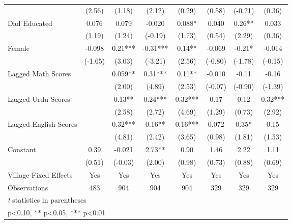 \begin{sidewaystable}[htbp]
\begin{tabular}{l*{7}{c}}
                &   (2.56)   &   (1.18)   &   (2.12)   &   (0.29)   &   (0.58)   &  (-0.21)   &   (0.36)   \\
Dad Educated    &    0.076   &    0.079   &   -0.020   &    0.088*  &    0.040   &     0.26** &    0.033   \\
                &   (1.19)   &   (1.24)   &  (-0.19)   &   (1.73)   &   (0.54)   &   (2.29)   &   (0.36)   \\
Female          &   -0.098   &     0.21***&    -0.31***&     0.14** &   -0.069   &    -0.21*  &   -0.014   \\
                &  (-1.65)   &   (3.03)   &  (-3.21)   &   (2.56)   &  (-0.80)   &  (-1.78)   &  (-0.15)   \\
Lagged Math Scores&            &    0.059** &     0.31***&     0.11** &   -0.010   &    -0.11   &    -0.16   \\
                &            &   (2.00)   &   (4.89)   &   (2.53)   &  (-0.07)   &  (-0.90)   &  (-1.39)   \\
Lagged Urdu Scores&            &     0.13** &     0.24***&     0.32***&     0.17   &     0.12   &     0.32***\\
                &            &   (2.58)   &   (2.72)   &   (4.69)   &   (1.29)   &   (0.73)   &   (2.92)   \\
Lagged English Scores&            &     0.32***&     0.16** &     0.16***&    0.072   &     0.35*  &     0.15   \\
                &            &   (4.81)   &   (2.42)   &   (3.65)   &   (0.98)   &   (1.81)   &   (1.53)   \\
Constant        &     0.39   &   -0.021   &     2.73** &     0.90   &     1.46   &     2.22   &     1.11   \\
                &   (0.51)   &  (-0.03)   &   (2.00)   &   (0.98)   &   (0.73)   &   (0.88)   &   (0.69)   \\
Village Fixed Effects&      Yes   &      Yes   &      Yes   &      Yes   &      Yes   &      Yes   &      Yes   \\
\midrule
Observations    &      483   &      904   &      904   &      904   &      329   &      329   &      329   \\
\bottomrule
\multicolumn{8}{l}{\footnotesize \textit{t} statistics in parentheses}\\
\multicolumn{8}{l}{\footnotesize * p<0.10, ** p<0.05, *** p<0.01}\\
\end{tabular}
\end{sidewaystable}
